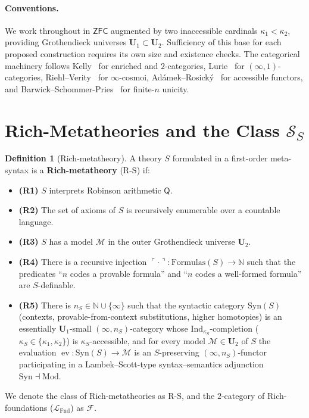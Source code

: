 \documentclass[11pt]{article}
\theoremstyle{plain}
\theoremstyle{definition}
\newtheorem{definition}[theorem]{Definition}
\newcommand{\RS}{\mathrm{R\text{-}S}}
\newcommand{\cS}{\mathcal{S}}
\newcommand{\cF}{\mathcal{F}}
\newcommand{\cM}{\mathcal{M}}
\newcommand{\LFnd}{\mathcal{L}_{\mathrm{Fnd}}}
\newcommand{\Syn}{\mathrm{Syn}}
\newcommand{\Mod}{\mathrm{Mod}}
\newcommand{\ZFC}{\mathsf{ZFC}}
\DeclareMathOperator{\ev}{ev}
\begin{document}
\paragraph{Conventions.} We work throughout in $\ZFC$ augmented by two inaccessible cardinals $\kappa_1 < \kappa_2$, providing Grothendieck universes $\mathbf{U}_1 \subset \mathbf{U}_2$. Sufficiency of this base for each proposed construction requires its own size and existence checks. The categorical machinery follows Kelly~\cite{Kelly1982} for enriched and $2$-categories, Lurie~\cite{LurieHTT, LurieHA} for $(\infty, 1)$-categories, Riehl--Verity~\cite{RiehlVerity2022} for $\infty$-cosmoi, Ad\'amek--Rosick\'y~\cite{AdamekRosicky1994} for accessible functors, and Barwick--Schommer-Pries~\cite{BarwickSchommerPries2021} for finite-$n$ unicity.

\section{\texorpdfstring{Rich-Metatheories and the Class $\cS_S$}{Rich-Metatheories and the Class S-S}}\label{sec:rs}

\begin{definition}[Rich-metatheory]\label{def:rs}
A theory $S$ formulated in a first-order meta-syntax is a \textbf{Rich-metatheory} ($\RS$) if:
\begin{itemize}
\item \textbf{(R1)} $S$ interprets Robinson arithmetic $\mathsf{Q}$.
\item \textbf{(R2)} The set of axioms of $S$ is recursively enumerable over a countable language.
\item \textbf{(R3)} $S$ has a model $\cM$ in the outer Grothendieck universe $\mathbf U_2$.
\item \textbf{(R4)} There is a recursive injection $\ulcorner \cdot \urcorner : \mathrm{Formulas}(S) \to \mathbb{N}$ such that the predicates ``$n$ codes a provable formula'' and ``$n$ codes a well-formed formula'' are $S$-definable.
\item \textbf{(R5)} There is $n_S \in \mathbb{N} \cup \{\infty\}$ such that the syntactic category $\Syn(S)$ (contexts, provable-from-context substitutions, higher homotopies) is an essentially $\mathbf{U}_1$-small $(\infty, n_S)$-category whose $\mathrm{Ind}_{\kappa_S}$-completion ($\kappa_S \in \{\kappa_1, \kappa_2\}$) is $\kappa_S$-accessible, and for every model $\cM \in \mathbf{U}_2$ of $S$ the evaluation $\ev : \Syn(S) \to \cM$ is an $S$-preserving $(\infty, n_S)$-functor participating in a Lambek--Scott-type syntax--semantics adjunction $\Syn \dashv \Mod$.
\end{itemize}
We denote the class of Rich-metatheories as $\RS$, and the $2$-category of Rich-foundations ($\LFnd$) as $\cF$.
\end{definition}
\end{document}
